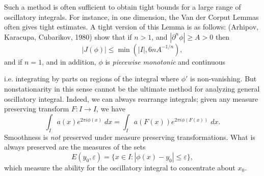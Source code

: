 %



Such a method is often sufficient to obtain tight bounds for a large range of oscillatory integrals. For instance, in one dimension, the Van der Corput Lemmas often gives tight estimates. A tight version of this Lemma is as follows: (Arhipov, Karacupa, Cubarikov, 1980) show that if $n > 1$, and $|\partial^n \phi| \geq A > 0$ then
%
\[ |J(\phi)| \leq \min(|I|, 6n A^{-1/n}), \]
%
and if $n = 1$, and in addition, $\phi$ is \emph{piecewise monotonic} and continuous 



i.e. integrating by parts on regions of the integral where $\phi'$ is non-vanishing. But nonstationarity in this sense cannot be the ultimate method for analyzing general oscillatory integral. Indeed, we can always rearrange integrals; given any measure preserving transform $F: I \to I$, we have
%
\[ \int_I a(x) e^{2 \pi i \phi(x)}\; dx = \int_I a(F(x)) e^{2 \pi i \phi(F(x))}\; dx. \]
%
Smoothness is \emph{not} preserved under measure preserving transformations. What is always preserved are the measures of the sets
%
\[ E(y_0,\varepsilon) = \{ x \in I: |\phi(x) - y_0| \leq \varepsilon \}, \]
%
which measure the ability for the oscillatory integral to concentrate about $x_0$.	